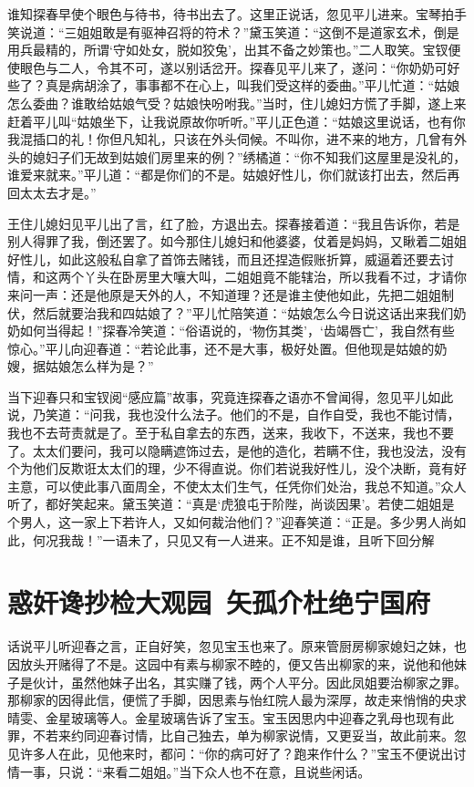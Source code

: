\documentclass[12pt,oneside]{book}
\begin{document}
谁知探春早使个眼色与待书，待书出去了。这里正说话，忽见平儿进来。宝琴拍手笑说道：“三姐姐敢是有驱神召将的符术？”黛玉笑道：“这倒不是道家玄术，倒是用兵最精的，所谓‘守如处女，脱如狡兔’，出其不备之妙策也。”二人取笑。宝钗便使眼色与二人，令其不可，遂以别话岔开。探春见平儿来了，遂问：“你奶奶可好些了？真是病胡涂了，事事都不在心上，叫我们受这样的委曲。”平儿忙道：“姑娘怎么委曲？谁敢给姑娘气受？姑娘快吩咐我。”当时，住儿媳妇方慌了手脚，遂上来赶着平儿叫“姑娘坐下，让我说原故你听听。”平儿正色道：“姑娘这里说话，也有你我混插口的礼！你但凡知礼，只该在外头伺候。不叫你，进不来的地方，几曾有外头的媳妇子们无故到姑娘们房里来的例？”绣橘道：“你不知我们这屋里是没礼的，谁爱来就来。”平儿道：“都是你们的不是。姑娘好性儿，你们就该打出去，然后再回太太去才是。”

王住儿媳妇见平儿出了言，红了脸，方退出去。探春接着道：“我且告诉你，若是别人得罪了我，倒还罢了。如今那住儿媳妇和他婆婆，仗着是妈妈，又瞅着二姐姐好性儿，如此这般私自拿了首饰去赌钱，而且还捏造假账折算，威逼着还要去讨情，和这两个丫头在卧房里大嚷大叫，二姐姐竟不能辖治，所以我看不过，才请你来问一声：还是他原是天外的人，不知道理？还是谁主使他如此，先把二姐姐制伏，然后就要治我和四姑娘了？”平儿忙陪笑道：“姑娘怎么今日说这话出来我们奶奶如何当得起！”探春冷笑道：“俗语说的，‘物伤其类’，‘齿竭唇亡’，我自然有些惊心。”平儿向迎春道：“若论此事，还不是大事，极好处置。但他现是姑娘的奶嫂，据姑娘怎么样为是？”

当下迎春只和宝钗阅“感应篇”故事，究竟连探春之语亦不曾闻得，忽见平儿如此说，乃笑道：“问我，我也没什么法子。他们的不是，自作自受，我也不能讨情，我也不去苛责就是了。至于私自拿去的东西，送来，我收下，不送来，我也不要了。太太们要问，我可以隐瞒遮饰过去，是他的造化，若瞒不住，我也没法，没有个为他们反欺诳太太们的理，少不得直说。你们若说我好性儿，没个决断，竟有好主意，可以使此事八面周全，不使太太们生气，任凭你们处治，我总不知道。”众人听了，都好笑起来。黛玉笑道：“真是‘虎狼屯于阶陛，尚谈因果’。若使二姐姐是个男人，这一家上下若许人，又如何裁治他们？”迎春笑道：“正是。多少男人尚如此，何况我哉！”一语未了，只见又有一人进来。正不知是谁，且听下回分解


 
\chapter{惑奸谗抄检大观园~矢孤介杜绝宁国府}
话说平儿听迎春之言，正自好笑，忽见宝玉也来了。原来管厨房柳家媳妇之妹，也因放头开赌得了不是。这园中有素与柳家不睦的，便又告出柳家的来，说他和他妹子是伙计，虽然他妹子出名，其实赚了钱，两个人平分。因此凤姐要治柳家之罪。那柳家的因得此信，便慌了手脚，因思素与怡红院人最为深厚，故走来悄悄的央求晴雯、金星玻璃等人。金星玻璃告诉了宝玉。宝玉因思内中迎春之乳母也现有此罪，不若来约同迎春讨情，比自己独去，单为柳家说情，又更妥当，故此前来。忽见许多人在此，见他来时，都问：“你的病可好了？跑来作什么？”宝玉不便说出讨情一事，只说：“来看二姐姐。”当下众人也不在意，且说些闲话。
\end{document}
